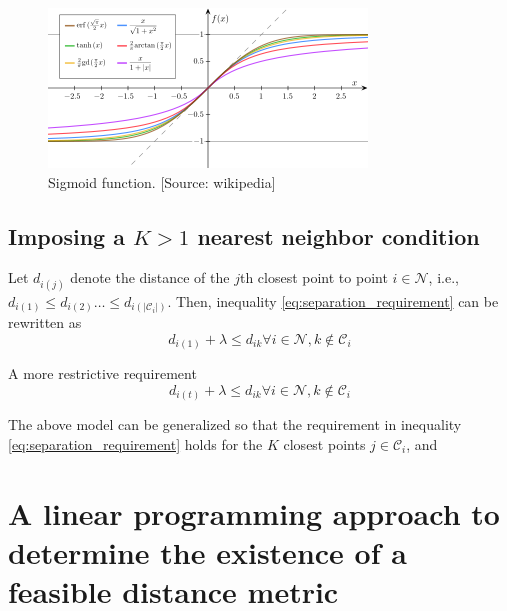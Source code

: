 \documentclass[]{article}
\newcommand{\mc}{\mathcal}
\begin{document}
\begin{figure}[htbp]
\begin{center}
\includegraphics[scale=0.7]{sigmoid_from_wikipedia.png}
\caption{Sigmoid function. [Source: wikipedia]}
\label{fig:sigmoid}
\end{center}
\end{figure}


\subsection{Imposing a $K>1$ nearest neighbor condition}

Let $d_{i(j)}$ denote the distance of the $j$th closest point to point $i \in \mc{N}$, i.e.,
$d_{i(1)} \leq d_{i(2)} \dots\leq d_{i(|\mc{C}_i|)}$. 
Then, inequality \eqref{eq:separation_requirement} can be rewritten as 
\begin{equation}
d_{i(1)} + \lambda \leq d_{ik} \forall i \in \mc{N}, k \notin \mc{C}_i
\end{equation}

A more restrictive requirement 
\begin{equation}
d_{i(t)} + \lambda \leq d_{ik} \forall i \in \mc{N}, k \notin \mc{C}_i
\end{equation}

The above model can be generalized so that the requirement in inequality \eqref{eq:separation_requirement} holds for the $K$ closest points $j \in \mc{C}_i$, and 






\newpage
\section{A linear programming approach to determine the existence of a feasible distance metric}
\end{document}
